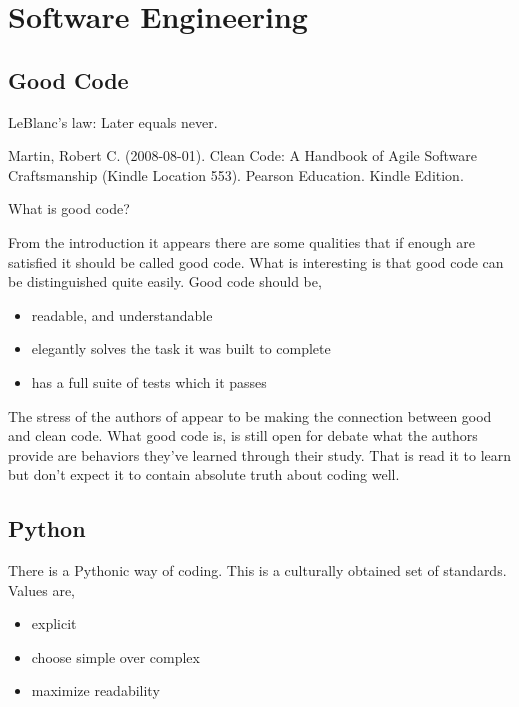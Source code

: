 \documentclass[11pt,letterpaper,oneside]{memoir}
\theoremstyle{definition}
\newtheorem{defn}{Definition}
\begin{document}
\begin{comment}
\begin{defn}[Task]
  \label{defn:task}
  An abstract representation of a problem we want to solve regarding the domain objects of import.
\end{defn}
\end{comment}

\chapter{Software Engineering}
\section{Good Code}
LeBlanc's law: Later equals never.

Martin, Robert C. (2008-08-01). Clean Code: A Handbook of Agile Software Craftsmanship (Kindle Location 553). Pearson Education. Kindle Edition. 

What is good code?

From the introduction it appears there are some qualities that if enough are satisfied it should be called good code.  What is interesting is that good code can be distinguished quite easily.  Good code should be,

\begin{itemize}
  \item readable, and understandable
  \item elegantly solves the task it was built to complete 
  \item has a full suite of tests which it passes
\end{itemize}
The stress of the authors of \cite{martin2009clean} appear to be making the connection between good and clean code.  What good code is, is still open for debate what the authors provide are behaviors they've learned through their study.  That is read it to learn but don't expect it to contain absolute truth about coding well.
\section{Python}
There is a Pythonic way of coding.  This is a culturally obtained set of standards.  Values are,

\begin{itemize}
  \item explicit
  \item choose simple over complex
  \item maximize readability
\end{itemize}
\end{document}

